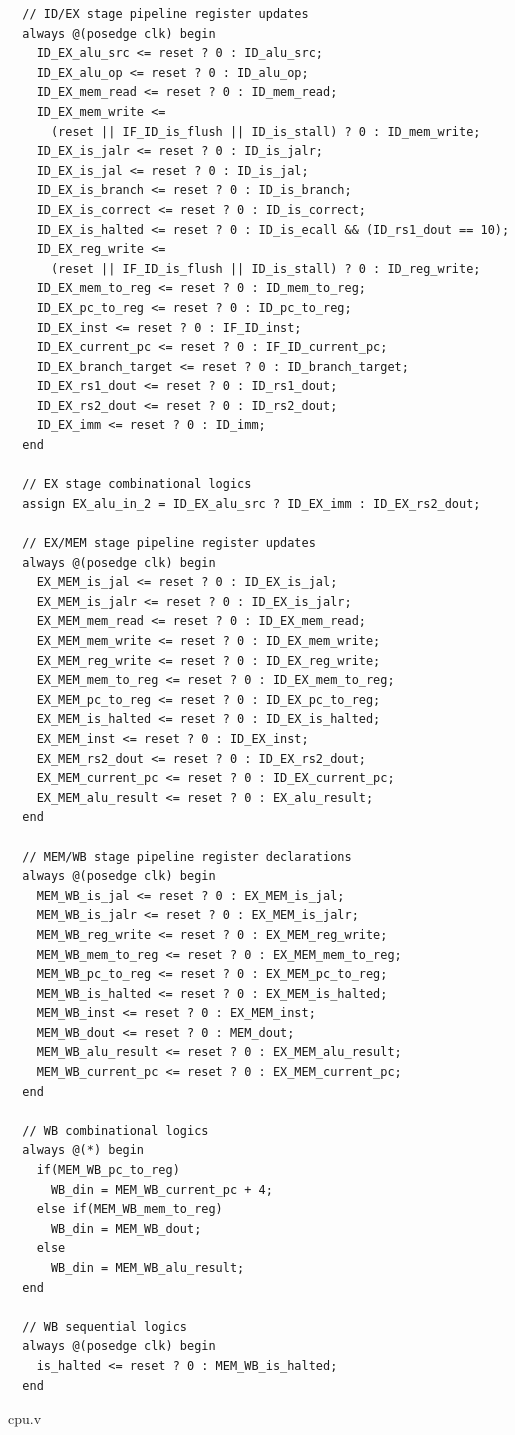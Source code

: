 \documentclass[openright, a4paper]{article}
\newenvironment{longlisting}{\captionsetup{type=listing}}{}
\begin{document}
\begin{longlisting}
\begin{verbatim}
  // ID/EX stage pipeline register updates
  always @(posedge clk) begin
    ID_EX_alu_src <= reset ? 0 : ID_alu_src;
    ID_EX_alu_op <= reset ? 0 : ID_alu_op;
    ID_EX_mem_read <= reset ? 0 : ID_mem_read;
    ID_EX_mem_write <= 
      (reset || IF_ID_is_flush || ID_is_stall) ? 0 : ID_mem_write;
    ID_EX_is_jalr <= reset ? 0 : ID_is_jalr;
    ID_EX_is_jal <= reset ? 0 : ID_is_jal;
    ID_EX_is_branch <= reset ? 0 : ID_is_branch;
    ID_EX_is_correct <= reset ? 0 : ID_is_correct;
    ID_EX_is_halted <= reset ? 0 : ID_is_ecall && (ID_rs1_dout == 10);
    ID_EX_reg_write <= 
      (reset || IF_ID_is_flush || ID_is_stall) ? 0 : ID_reg_write;
    ID_EX_mem_to_reg <= reset ? 0 : ID_mem_to_reg;
    ID_EX_pc_to_reg <= reset ? 0 : ID_pc_to_reg;
    ID_EX_inst <= reset ? 0 : IF_ID_inst;
    ID_EX_current_pc <= reset ? 0 : IF_ID_current_pc;
    ID_EX_branch_target <= reset ? 0 : ID_branch_target;
    ID_EX_rs1_dout <= reset ? 0 : ID_rs1_dout;
    ID_EX_rs2_dout <= reset ? 0 : ID_rs2_dout;
    ID_EX_imm <= reset ? 0 : ID_imm;
  end

  // EX stage combinational logics
  assign EX_alu_in_2 = ID_EX_alu_src ? ID_EX_imm : ID_EX_rs2_dout; 

  // EX/MEM stage pipeline register updates
  always @(posedge clk) begin
    EX_MEM_is_jal <= reset ? 0 : ID_EX_is_jal;
    EX_MEM_is_jalr <= reset ? 0 : ID_EX_is_jalr;
    EX_MEM_mem_read <= reset ? 0 : ID_EX_mem_read;
    EX_MEM_mem_write <= reset ? 0 : ID_EX_mem_write;
    EX_MEM_reg_write <= reset ? 0 : ID_EX_reg_write;
    EX_MEM_mem_to_reg <= reset ? 0 : ID_EX_mem_to_reg;
    EX_MEM_pc_to_reg <= reset ? 0 : ID_EX_pc_to_reg;
    EX_MEM_is_halted <= reset ? 0 : ID_EX_is_halted;
    EX_MEM_inst <= reset ? 0 : ID_EX_inst;
    EX_MEM_rs2_dout <= reset ? 0 : ID_EX_rs2_dout;
    EX_MEM_current_pc <= reset ? 0 : ID_EX_current_pc;
    EX_MEM_alu_result <= reset ? 0 : EX_alu_result;
  end

  // MEM/WB stage pipeline register declarations
  always @(posedge clk) begin
    MEM_WB_is_jal <= reset ? 0 : EX_MEM_is_jal;
    MEM_WB_is_jalr <= reset ? 0 : EX_MEM_is_jalr;
    MEM_WB_reg_write <= reset ? 0 : EX_MEM_reg_write;
    MEM_WB_mem_to_reg <= reset ? 0 : EX_MEM_mem_to_reg;
    MEM_WB_pc_to_reg <= reset ? 0 : EX_MEM_pc_to_reg;
    MEM_WB_is_halted <= reset ? 0 : EX_MEM_is_halted;
    MEM_WB_inst <= reset ? 0 : EX_MEM_inst;
    MEM_WB_dout <= reset ? 0 : MEM_dout;
    MEM_WB_alu_result <= reset ? 0 : EX_MEM_alu_result;
    MEM_WB_current_pc <= reset ? 0 : EX_MEM_current_pc;
  end

  // WB combinational logics
  always @(*) begin
    if(MEM_WB_pc_to_reg)
      WB_din = MEM_WB_current_pc + 4;
    else if(MEM_WB_mem_to_reg)
      WB_din = MEM_WB_dout;
    else
      WB_din = MEM_WB_alu_result;
  end

  // WB sequential logics
  always @(posedge clk) begin
    is_halted <= reset ? 0 : MEM_WB_is_halted;
  end
    \end{verbatim}
    \caption{cpu.v}
\end{longlisting}
\end{document}
